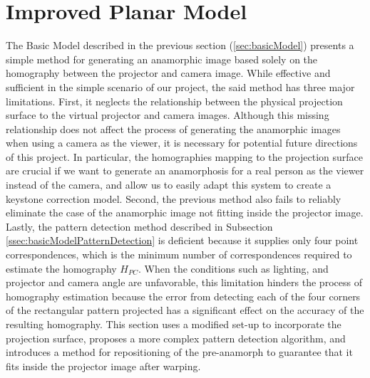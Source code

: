 \documentclass[11pt, oneside, reqno]{book}
\begin{document}

\section{Improved Planar Model} %
\label{sec:improveModel}
The Basic Model described in the previous section (\ref{sec:basicModel}) presents a simple method for generating an anamorphic image based solely on the homography between the projector and camera image. While effective and sufficient in the simple scenario of our project, the said method has three major limitations. 
First, it neglects the relationship between the physical projection surface to the virtual projector and camera images. Although this missing relationship does not affect the process of generating the anamorphic images when using a camera as the viewer, it is necessary for potential future directions of this project. In particular, the homographies mapping to the projection surface are crucial if we want to generate an anamorphosis for a real person as the viewer instead of the camera, and allow us to easily adapt this system to create a keystone correction model. 
Second, the previous method also fails to reliably eliminate the case of the anamorphic image not fitting inside the projector image. 
Lastly, the pattern detection method described in Subsection \ref{ssec:basicModelPatternDetection} is deficient because it supplies only four point correspondences, which is the minimum number of correspondences required to estimate the homography $H_{PC}$. When the conditions such as lighting, and projector and camera angle are unfavorable, this limitation hinders the process of homography estimation because the error from detecting each of the four corners of the rectangular pattern projected has a significant effect on the accuracy of the resulting homography.
This section uses a modified set-up to incorporate the projection surface, proposes a more complex pattern detection algorithm, and introduces a method for repositioning of the pre-anamorph to guarantee that it fits inside the projector image after warping. 
\end{document}
